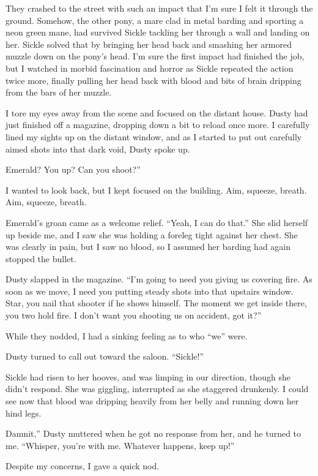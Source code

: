 They crashed to the street with such an impact that I’m sure I felt it through the ground. Somehow, the other pony, a mare clad in metal barding and sporting a neon green mane, had survived Sickle tackling her through a wall and landing on her. Sickle solved that by bringing her head back and smashing her armored muzzle down on the pony’s head. I’m sure the first impact had finished the job, but I watched in morbid fascination and horror as Sickle repeated the action twice more, finally pulling her head back with blood and bits of brain dripping from the bars of her muzzle.

I tore my eyes away from the scene and focused on the distant house. Dusty had just finished off a magazine, dropping down a bit to reload once more. I carefully lined my sights up on the distant window, and as I started to put out carefully aimed shots into that dark void, Dusty spoke up.

\leavevmode{}Emerald? You up? Can you shoot?”

I wanted to look back, but I kept focused on the building. Aim, squeeze, breath. Aim, squeeze, breath.

Emerald’s groan came as a welcome relief. “Yeah, I can do that.” She slid herself up beside me, and I saw she was holding a foreleg tight against her chest. She was clearly in pain, but I saw no blood, so I assumed her barding had again stopped the bullet.

Dusty slapped in the magazine. “I’m going to need you giving us covering fire. As soon as we move, I need you putting steady shots into that upstairs window. Star, you nail that shooter if he shows himself. The moment we get inside there, you two hold fire. I don’t want you shooting us on accident, got it?”

While they nodded, I had a sinking feeling as to who “we” were.

Dusty turned to call out toward the saloon. “Sickle!”

Sickle had risen to her hooves, and was limping in our direction, though she didn’t respond. She was giggling, interrupted as she staggered drunkenly. I could see now that blood was dripping heavily from her belly and running down her hind legs.

\leavevmode{}Damnit,” Dusty muttered when he got no response from her, and he turned to me. “Whisper, you’re with me. Whatever happens, keep up!”

Despite my concerns, I gave a quick nod.

